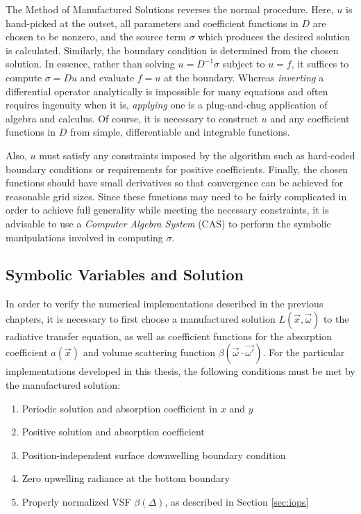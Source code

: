 The Method of Manufactured Solutions reverses the normal procedure.
Here, $u$ is hand-picked at the outset, all parameters and coefficient functions in $D$ are chosen to be nonzero, and the source term $\sigma$ which produces the desired solution is calculated.
Similarly, the boundary condition is determined from the chosen solution.
In essence, rather than solving $u = D^{-1}\sigma$ subject to $u=f$, it suffices to compute $\sigma = Du$ and evaluate $f=u$ at the boundary.
Whereas \textit{inverting} a differential operator analytically is impossible for many equations and often requires ingenuity when it is, \textit{applying} one is a plug-and-chug application of algebra and calculus.
Of course, it is necessary to construct $u$ and any coefficient functions in $D$ from simple, differentiable and integrable functions.

Also, $u$ must satisfy any constraints imposed by the algorithm such as hard-coded boundary conditions or requirements for positive coefficients.
Finally, the chosen functions should have small derivatives so that convergence can be achieved for reasonable grid sizes.
Since these functions may need to be fairly complicated in order to achieve full generality while meeting the necessary constraints, it is advisable to use a \textit{Computer Algebra System} (CAS) to perform the symbolic manipulations involved in computing $\sigma$.

\subsection{Symbolic Variables and Solution}
In order to verify the numerical implementations described in the previous chapters, it is necessary to first choose a manufactured solution $L(\vec{x}, \vec{\omega})$ to the radiative transfer equation, as well as coefficient functions for the absorption coefficient $a(\vec{x})$ and volume scattering function $\beta(\vec{\omega}\cdot\vec{\omega'})$.
For the particular implementations developed in this thesis, the following conditions must be met by the manufactured solution:
\begin{enumerate}
  \item Periodic solution and absorption coefficient in $x$ and $y$
  \item Positive solution and absorption coefficient
  \item Position-independent surface downwelling boundary condition
  \item Zero upwelling radiance at the bottom boundary
  \item Properly normalized VSF $\beta(\Delta)$, as described in Section \ref{sec:iops}
\end{enumerate}


